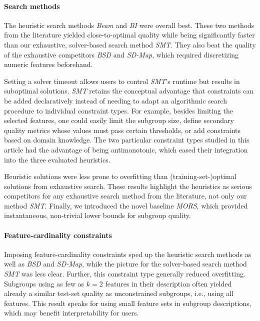 \documentclass[acmsmall]{acmart} %
\theoremstyle{acmplain}
\theoremstyle{acmdefinition}
\begin{document}
\paragraph{Search methods}

The heuristic search methods \emph{Beam} and \emph{BI} were overall best.
These two methods from the literature yielded close-to-optimal quality while being significantly faster than our exhaustive, solver-based search method \emph{SMT}.
They also beat the quality of the exhaustive competitors \emph{BSD} and \emph{SD-Map}, which required discretizing numeric features beforehand.

Setting a solver timeout allows users to control \emph{SMT}'s runtime but results in suboptimal solutions.
\emph{SMT} retains the conceptual advantage that constraints can be added declaratively instead of needing to adapt an algorithmic search procedure to individual constraint types.
For example, besides limiting the selected features, one could easily limit the subgroup size, define secondary quality metrics whose values must pass certain thresholds, or add constraints based on domain knowledge.
The two particular constraint types studied in this article had the advantage of being antimonotonic, which eased their integration into the three evaluated heuristics.

Heuristic solutions were less prone to overfitting than (training-set-)optimal solutions from exhaustive search.
These results highlight the heuristics as serious competitors for any exhaustive search method from the literature, not only our method \emph{SMT}.
Finally, we introduced the novel baseline \emph{MORS}, which provided instantaneous, non-trivial lower bounds for subgroup quality.

\paragraph{Feature-cardinality constraints}

Imposing feature-cardinality constraints sped up the heuristic search methods as well as \emph{BSD} and \emph{SD-Map}, while the picture for the solver-based search method \emph{SMT} was less clear.
Further, this constraint type generally reduced overfitting.
Subgroups using as few as $k=2$ features in their description often yielded already a similar test-set quality as unconstrained subgroups, i.e., using all features.
This result speaks for using small feature sets in subgroup descriptions, which may benefit interpretability for users.
\end{document}
